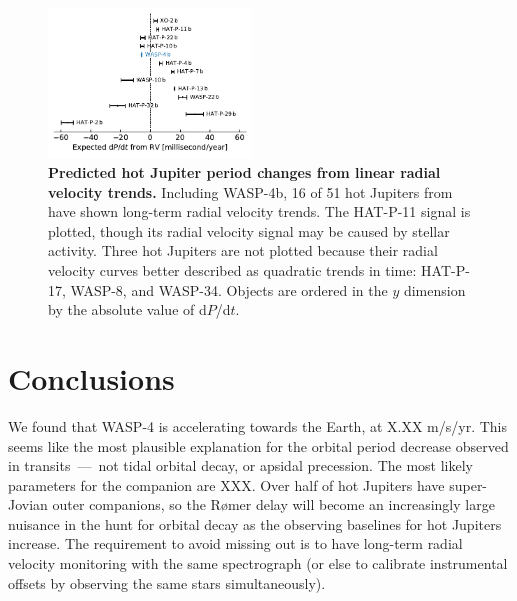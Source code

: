 \documentclass[12pt,twocolumn,tighten]{aastex62}
\begin{document}
\begin{figure}[t]
	\begin{center}
		\leavevmode
		\includegraphics[width=0.48\textwidth]{f5.pdf}
	\end{center}
	\vspace{-0.7cm}
	\caption{
  {\bf Predicted hot Jupiter period changes from linear radial
  velocity trends.} Including WASP-4b, 16 of 51 hot Jupiters from
  \citet{knutson_friends_2014} have shown long-term radial velocity
  trends.  The HAT-P-11 signal is plotted, though its radial velocity
  signal may be caused by stellar activity.  Three hot Jupiters are
  not plotted because their radial velocity curves better described as
  quadratic trends in time: HAT-P-17, WASP-8, and WASP-34.  Objects
  are ordered in the $y$ dimension by the absolute value of d$P$/d$t$.
	\label{fig:pdot_pop}
  \vspace{-0.3cm}
	}
\end{figure}


\section{Conclusions}
\label{sec:conclusions}

We found that WASP-4 is accelerating towards the Earth, at
X.XX m/s/yr.
This seems like the most plausible explanation for the orbital 
period decrease observed in transits~---~not tidal
orbital decay, or apsidal precession.
The most likely parameters for the companion are XXX.
Over half of hot Jupiters have super-Jovian outer companions,
so the R{\o}mer delay will become an increasingly large nuisance in
the hunt for orbital decay as
the observing baselines for hot Jupiters increase.
The requirement to avoid missing out is to have long-term
radial velocity monitoring with the same spectrograph (or else to
calibrate instrumental offsets by observing the same stars simultaneously).



\end{document}
